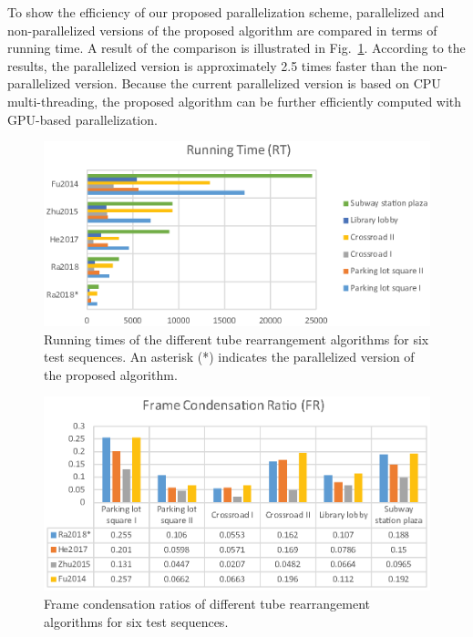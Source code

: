 \documentclass[11pt]{hyu_thesis}
\begin{document}
To show the efficiency of our proposed parallelization scheme, parallelized and non-parallelized versions of the proposed algorithm are compared in terms of running time. A result of the comparison is illustrated in Fig.~\ref{fig:RT}. According to the results, the parallelized version is approximately 2.5 times faster than the non-parallelized version. Because the current parallelized version is based on CPU multi-threading, the proposed algorithm can be further efficiently computed with GPU-based parallelization.

\begin{figure}[t]
\begin{center}
\includegraphics[width=0.9\linewidth]{RT.eps}
\end{center}
   \caption{Running times of the different tube rearrangement algorithms for six test sequences. An asterisk (*) indicates the parallelized version of the proposed algorithm.}
\label{fig:RT}
\end{figure}

\begin{figure}[t]
\begin{center}
\includegraphics[width=0.9\linewidth]{FCR.eps}
\end{center}
   \caption{Frame condensation ratios of different tube rearrangement algorithms for six test sequences.}
\label{fig:FCR}
\end{figure}
\end{document}
